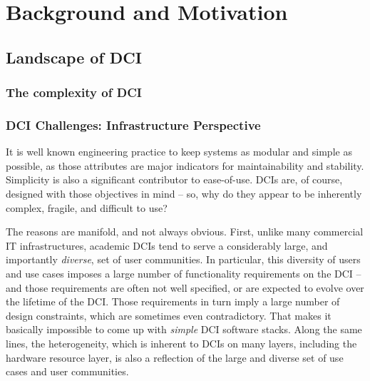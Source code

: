 \documentclass[a4paper,12pt]{article}
\newcommand{\I}[1]{\textit{#1}}
\begin{document}
 


% 

\section{Background and Motivation}

\subsection{Landscape of DCI}

\subsubsection{The complexity of DCI}

\subsubsection{DCI Challenges: Infrastructure Perspective}

  It is well known engineering practice to keep systems as modular and
  simple as possible, as those attributes are major indicators for
  maintainability and stability.  Simplicity is also a significant
  contributor to ease-of-use.  DCIs are, of course, designed with
  those objectives in mind -- so, why do they appear to be inherently
  complex, fragile, and difficult to use?

  The reasons are manifold, and not always obvious.  First, unlike
  many commercial IT infrastructures, academic DCIs tend to serve a
  considerably large, and importantly \I{diverse}, set of user
  communities.  In particular, this diversity of users and use cases
  imposes a large number of functionality requirements on the DCI --
  and those requirements are often not well specified, or are expected
  to evolve over the lifetime of the DCI.  Those requirements in turn
  imply a large number of design constraints, which are sometimes even
  contradictory.  That makes it basically impossible to come up with
  \I{simple} DCI software stacks.  Along the same lines, the
  heterogeneity, which is inherent to DCIs on many layers, including
  the hardware resource layer, is also a reflection of the large and
  diverse set of use cases and user communities.
\end{document}
